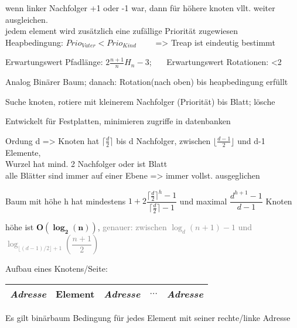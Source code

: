 wenn linker Nachfolger +1 oder -1 war, dann für höhere knoten vllt. weiter ausgleichen.\\





jedem element wird zusätzlich eine zufällige Priorität zugewiesen\\
Heapbedingung: $Prio_{Vater} < Prio_{Kind}$~~~~
=> Treap ist eindeutig bestimmt

Erwartungswert Pfadlänge: $2\frac{n+1}{n}H_n-3$; ~~~Erwartungswert Rotationen: <2 

Analog Binärer Baum; danach: Rotation(nach oben) bis heapbedingung erfüllt

Suche knoten, rotiere mit kleinerem Nachfolger (Priorität) bis Blatt; lösche


\renewcommand{\min}{\lceil\frac{d}{2}\rceil}
\newcommand{\mincontent}{\lfloor\frac{d-1}{2}\rfloor}
Entwickelt für Festplatten, minimieren zugriffe in datenbanken

Ordung d => Knoten hat $\min$ bis d Nachfolger, zwischen $\mincontent$ und d-1 Elemente,\\
Wurzel hat mind. 2 Nachfolger oder ist Blatt \\
alle Blätter sind immer auf einer Ebene => immer vollst. ausgeglichen 

Baum mit höhe h hat mindestens $1+2\dfrac{\min^h - 1}{\min -1}$ und maximal $ \dfrac{d^{h+1}-1}{d-1}$ Knoten

höhe ist $\mathbf{O(\log_2(n))}$, \textcolor{gray}{genauer: zwischen $\log_d(n+1)-1$ und $\log_{\lfloor(d-1)/2\rfloor+1}\left(\dfrac{n+1}{2}\right)$}

Aufbau eines Knotens/Seite:
\begin{tabular}{|c|c|c|c|c|}
\hline
\textit{Adresse} & Element & \textit{Adresse} & $\dots$ & \textit{Adresse}\\
\hline
\end{tabular}

Es gilt binärbaum Bedingung für jedes Element mit seiner rechte/linke Adresse

